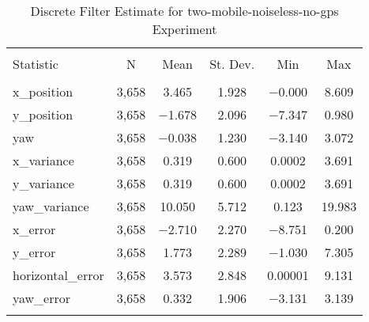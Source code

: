 
\begin{table}[h] \centering 
  \caption{Discrete Filter Estimate for two-mobile-noiseless-no-gps Experiment} 
  \label{tab:two_mobile_noiseless_no_gps_discrete_summary} 
\begin{tabular}{@{\extracolsep{5pt}}lccccc} 
\\[-1.8ex]\hline 
\hline \\[-1.8ex] 
Statistic & \multicolumn{1}{c}{N} & \multicolumn{1}{c}{Mean} & \multicolumn{1}{c}{St. Dev.} & \multicolumn{1}{c}{Min} & \multicolumn{1}{c}{Max} \\ 
\hline \\[-1.8ex] 
x\_position & 3,658 & 3.465 & 1.928 & $-$0.000 & 8.609 \\ 
y\_position & 3,658 & $-$1.678 & 2.096 & $-$7.347 & 0.980 \\ 
yaw & 3,658 & $-$0.038 & 1.230 & $-$3.140 & 3.072 \\ 
x\_variance & 3,658 & 0.319 & 0.600 & 0.0002 & 3.691 \\ 
y\_variance & 3,658 & 0.319 & 0.600 & 0.0002 & 3.691 \\ 
yaw\_variance & 3,658 & 10.050 & 5.712 & 0.123 & 19.983 \\ 
x\_error & 3,658 & $-$2.710 & 2.270 & $-$8.751 & 0.200 \\ 
y\_error & 3,658 & 1.773 & 2.289 & $-$1.030 & 7.305 \\ 
horizontal\_error & 3,658 & 3.573 & 2.848 & 0.00001 & 9.131 \\ 
yaw\_error & 3,658 & 0.332 & 1.906 & $-$3.131 & 3.139 \\ 
\hline \\[-1.8ex] 
\end{tabular} 
\end{table} 
